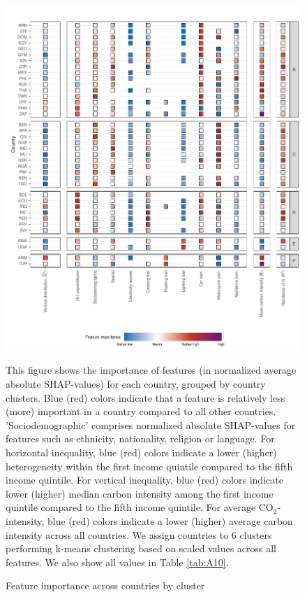 \documentclass[12pt, a4paper]{article}
\newenvironment{subcaption2}
{\strut
\vspace{-5pt}
\begin{minipage}[b]{0.9\textwidth}
  \hspace*{-\parindent}
  \footnotesize}
 {\end{minipage}}
\begin{document}
\begin{figure}[ht!]
    \centering
    \includegraphics{Figure 4/Figure_4_Corrected_2}
    \caption{Feature importance across countries by cluster}
    \label{fig:fig_4_2}
    \begin{subcaption2}
    This figure shows the importance of features (in normalized average absolute SHAP-values) for each country, grouped by country clusters. Blue (red) colors indicate that a feature is relatively less (more) important in a country compared to all other countries. 'Sociodemographic' comprises normalized absolute SHAP-values for features such as ethnicity, nationality, religion or language.
    For horizontal inequality, blue (red) colors indicate a lower (higher) heterogeneity within the first income quintile compared to the fifth income quintile. For vertical inequality, blue (red) colors indicate lower (higher) median carbon intensity among the first income quintile compared to the fifth income quintile. For average CO$_{2}$-intensity, blue (red) colors indicate a lower (higher) average carbon intensity across all countries.
    We assign countries to 6 clusters performing k-means clustering based on scaled values across all features. We also show all values in Table \ref{tab:A10}.
    \end{subcaption2}
\end{figure}
\end{document}

